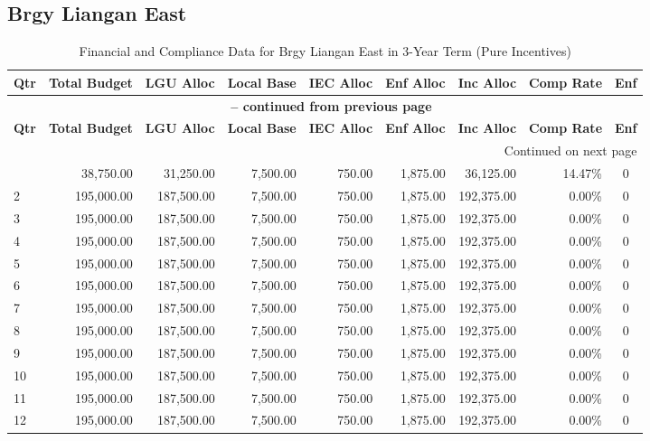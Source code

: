 \subsection{Brgy Liangan East}
\begin{longtable}{lrrrrrrrc}
\caption{Financial and Compliance Data for Brgy Liangan East in 3-Year Term (Pure Incentives)} \\
\toprule
\textbf{Qtr} & \textbf{Total Budget} & \textbf{LGU Alloc} & \textbf{Local Base} & \textbf{IEC Alloc} & \textbf{Enf Alloc} & \textbf{Inc Alloc} & \textbf{Comp Rate} & \textbf{Enf} \\
\midrule
\endfirsthead
\multicolumn{9}{c}{{\bfseries \tablename\ \thetable{} -- continued from previous page}} \\
\toprule
\textbf{Qtr} & \textbf{Total Budget} & \textbf{LGU Alloc} & \textbf{Local Base} & \textbf{IEC Alloc} & \textbf{Enf Alloc} & \textbf{Inc Alloc} & \textbf{Comp Rate} & \textbf{Enf} \\
\midrule
\endhead
\hline \multicolumn{9}{r}{{Continued on next page}} \\ \hline
\endfoot
\bottomrule
\endlastfoot
1 & 38,750.00 & 31,250.00 & 7,500.00 & 750.00 & 1,875.00 & 36,125.00 & 14.47\% & 0 \\
2 & 195,000.00 & 187,500.00 & 7,500.00 & 750.00 & 1,875.00 & 192,375.00 & 0.00\% & 0 \\
3 & 195,000.00 & 187,500.00 & 7,500.00 & 750.00 & 1,875.00 & 192,375.00 & 0.00\% & 0 \\
4 & 195,000.00 & 187,500.00 & 7,500.00 & 750.00 & 1,875.00 & 192,375.00 & 0.00\% & 0 \\
5 & 195,000.00 & 187,500.00 & 7,500.00 & 750.00 & 1,875.00 & 192,375.00 & 0.00\% & 0 \\
6 & 195,000.00 & 187,500.00 & 7,500.00 & 750.00 & 1,875.00 & 192,375.00 & 0.00\% & 0 \\
7 & 195,000.00 & 187,500.00 & 7,500.00 & 750.00 & 1,875.00 & 192,375.00 & 0.00\% & 0 \\
8 & 195,000.00 & 187,500.00 & 7,500.00 & 750.00 & 1,875.00 & 192,375.00 & 0.00\% & 0 \\
9 & 195,000.00 & 187,500.00 & 7,500.00 & 750.00 & 1,875.00 & 192,375.00 & 0.00\% & 0 \\
10 & 195,000.00 & 187,500.00 & 7,500.00 & 750.00 & 1,875.00 & 192,375.00 & 0.00\% & 0 \\
11 & 195,000.00 & 187,500.00 & 7,500.00 & 750.00 & 1,875.00 & 192,375.00 & 0.00\% & 0 \\
12 & 195,000.00 & 187,500.00 & 7,500.00 & 750.00 & 1,875.00 & 192,375.00 & 0.00\% & 0 \\
\end{longtable}
\newpage
